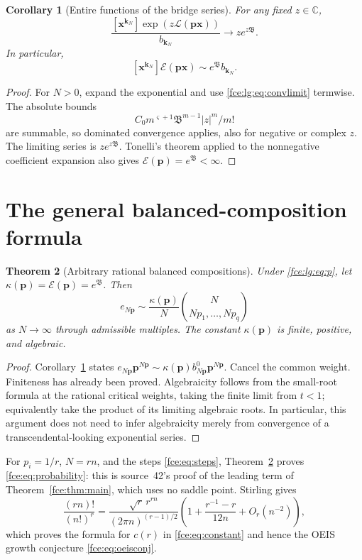 \documentclass[11pt,a4paper]{article}
\numberwithin{equation}{section}
\newtheorem{theorem}{Theorem}[section]
\newtheorem{corollary}[theorem]{Corollary}
\theoremstyle{definition}\newtheorem{definition}[theorem]{Definition}
\theoremstyle{remark}\newtheorem{remark}[theorem]{Remark}
\newcommand{\C}{\mathbb C}
\newcommand{\E}{\mathcal E}
\newcommand{\Lcal}{\mathcal L}
\newcommand{\Bmass}{\mathfrak B}
\begin{document}
\begin{corollary}[Entire functions of the bridge series]\label{fce:lg:cor:entire}
For any fixed $z\in\C$,
\begin{equation}\label{fce:lg:eq:entire}
 \frac{[\boldsymbol x^{\boldsymbol k_N}]\exp(z\Lcal(\boldsymbol p\boldsymbol x))}{b_{\boldsymbol k_N}}
 \longrightarrow z e^{z\Bmass}.
\end{equation}
In particular,
\[
 [\boldsymbol x^{\boldsymbol k_N}]\E(\boldsymbol p\boldsymbol x)\sim e^{\Bmass} b_{\boldsymbol k_N}.
\]
\end{corollary}
\begin{proof}
For $N>0$, expand the exponential and use \eqref{fce:lg:eq:convlimit}
termwise. The absolute bounds
\[
 C_0m^{\varsigma+1}\Bmass^{m-1}|z|^m/m!
\]
are summable, so dominated convergence applies, also for negative or
complex $z$. The limiting series is $ze^{z\Bmass}$. Tonelli's theorem
applied to the nonnegative coefficient expansion also gives
$\E(\boldsymbol p)=e^{\Bmass}<\infty$.
\end{proof}

\section{The general balanced-composition formula}\label{fce:lg:sec:general}
\begin{theorem}[Arbitrary rational balanced compositions]\label{fce:lg:thm:general}
Under \eqref{fce:lg:eq:p}, let $\kappa(\boldsymbol p)=\E(\boldsymbol p)=e^{\Bmass}$.
Then
\begin{equation}\label{fce:lg:eq:general}
 e_{N\boldsymbol p}\sim \frac{\kappa(\boldsymbol p)}{N}\binom{N}{Np_1,\ldots,Np_q}
\end{equation}
as $N\to\infty$ through admissible multiples. The constant
$\kappa(\boldsymbol p)$ is finite, positive, and algebraic.
\end{theorem}
\begin{proof}
Corollary~\ref{fce:lg:cor:entire} states
$e_{N\boldsymbol p}\boldsymbol p^{N\boldsymbol p}
\sim \kappa(\boldsymbol p)b^0_{N\boldsymbol p}\boldsymbol p^{N\boldsymbol p}$.
Cancel the common weight. Finiteness has already been proved. Algebraicity
follows from the small-root formula at the rational critical weights,
taking the finite limit from $t<1$; equivalently take the product of its
limiting algebraic roots. In particular, this argument does not need to
infer algebraicity merely from convergence of a transcendental-looking
exponential series.
\end{proof}
For $p_i=1/r$, $N=rn$, and the steps \eqref{fce:eq:steps},
Theorem~\ref{fce:lg:thm:general} proves \eqref{fce:eq:probability}: this is
source~42's proof of the leading term of Theorem~\ref{fce:thm:main}, which
uses no saddle point. Stirling gives
\begin{equation}\label{fce:lg:eq:multstirling}
 \frac{(rn)!}{(n!)^r}
 =\frac{\sqrt r\,r^{rn}}{(2\pi n)^{(r-1)/2}}
 \left(1+\frac{r^{-1}-r}{12n}+O_r(n^{-2})\right),
\end{equation}
which proves the formula for $c(r)$ in \eqref{fce:eq:constant} and hence
the OEIS growth conjecture \eqref{fce:eq:oeisconj}.
\end{document}
